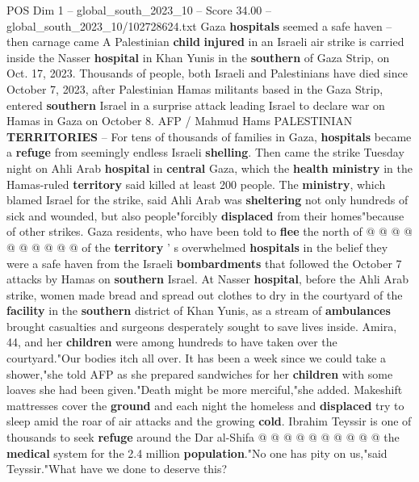 \begin{textsample}{POS Dim 1 – global\_south\_2023\_10 – Score 34.00 – global\_south\_2023\_10/102728624.txt}  \label{ex:f1_pos_188}
Gaza \textbf{hospitals} seemed a safe haven -- then carnage came A Palestinian \textbf{child} \textbf{injured} in an Israeli air strike is carried inside the Nasser \textbf{hospital} in Khan Yunis in the \textbf{southern} of Gaza Strip, on Oct. 17, 2023.
Thousands of people, both Israeli and Palestinians have died since October 7, 2023, after Palestinian Hamas militants based in the Gaza Strip, entered \textbf{southern} Israel in a surprise attack leading Israel to declare war on Hamas in Gaza on October 8.
AFP / Mahmud Hams PALESTINIAN \textbf{TERRITORIES} -- For tens of thousands of families in Gaza, \textbf{hospitals} became a \textbf{refuge} from seemingly endless Israeli \textbf{shelling}.
Then came the strike Tuesday night on Ahli Arab \textbf{hospital} in \textbf{central} Gaza, which the \textbf{health} \textbf{ministry} in the Hamas-ruled \textbf{territory} said killed at least 200 people.
The \textbf{ministry}, which blamed Israel for the strike, said Ahli Arab was \textbf{sheltering} not only hundreds of sick and wounded, but also people"forcibly \textbf{displaced} from their homes"because of other strikes.
Gaza residents, who have been told to \textbf{flee} the north of @ @ @ @ @ @ @ @ @ @ of the \textbf{territory} ' s overwhelmed \textbf{hospitals} in the belief they were a safe haven from the Israeli \textbf{bombardments} that followed the October 7 attacks by Hamas on \textbf{southern} Israel.
At Nasser \textbf{hospital}, before the Ahli Arab strike, women made bread and spread out clothes to dry in the courtyard of the \textbf{facility} in the \textbf{southern} district of Khan Yunis, as a stream of \textbf{ambulances} brought casualties and surgeons desperately sought to save lives inside.
Amira, 44, and her \textbf{children} were among hundreds to have taken over the courtyard."Our bodies itch all over.
It has been a week since we could take a shower,"she told AFP as she prepared sandwiches for her \textbf{children} with some loaves she had been given."Death might be more merciful,"she added.
Makeshift mattresses cover the \textbf{ground} and each night the homeless and \textbf{displaced} try to sleep amid the roar of air attacks and the growing \textbf{cold}.
Ibrahim Teyssir is one of thousands to seek \textbf{refuge} around the Dar al-Shifa @ @ @ @ @ @ @ @ @ @ the \textbf{medical} system for the 2.4 million \textbf{population}."No one has pity on us,"said Teyssir."What have we done to deserve this?

\end{textsample}

